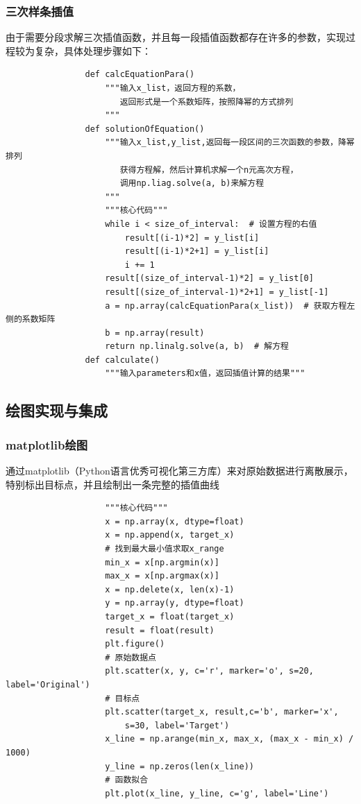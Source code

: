 \documentclass[UTF8]{ctexart}
\begin{document}
            \subsubsection{三次样条插值}
            由于需要分段求解三次插值函数，并且每一段插值函数都存在许多的参数，实现过程较为复杂，具体处理步骤如下：
            \begin{lstlisting}
                def calcEquationPara()
                    """输入x_list，返回方程的系数，
                       返回形式是一个系数矩阵，按照降幂的方式排列
                    """
                def solutionOfEquation()
                    """输入x_list,y_list,返回每一段区间的三次函数的参数，降幂排列
                       获得方程解，然后计算机求解一个n元高次方程，
                       调用np.liag.solve(a, b)来解方程
                    """
                    """核心代码"""
                    while i < size_of_interval:  # 设置方程的右值
                        result[(i-1)*2] = y_list[i]
                        result[(i-1)*2+1] = y_list[i]
                        i += 1
                    result[(size_of_interval-1)*2] = y_list[0]
                    result[(size_of_interval-1)*2+1] = y_list[-1]
                    a = np.array(calcEquationPara(x_list))  # 获取方程左侧的系数矩阵
                    b = np.array(result)
                    return np.linalg.solve(a, b)  # 解方程
                def calculate()
                    """输入parameters和x值，返回插值计算的结果"""
            \end{lstlisting}
        \subsection{绘图实现与集成}
            \subsubsection{matplotlib绘图}
            通过matplotlib（Python语言优秀可视化第三方库）来对原始数据进行离散展示，特别标出目标点，并且绘制出一条完整的插值曲线
                \begin{lstlisting}
                    """核心代码"""
                    x = np.array(x, dtype=float)
                    x = np.append(x, target_x)
                    # 找到最大最小值求取x_range
                    min_x = x[np.argmin(x)]
                    max_x = x[np.argmax(x)]
                    x = np.delete(x, len(x)-1)
                    y = np.array(y, dtype=float)
                    target_x = float(target_x)
                    result = float(result)
                    plt.figure()
                    # 原始数据点
                    plt.scatter(x, y, c='r', marker='o', s=20, label='Original')
                    # 目标点
                    plt.scatter(target_x, result,c='b', marker='x', 
                        s=30, label='Target')
                    x_line = np.arange(min_x, max_x, (max_x - min_x) / 1000)
                    y_line = np.zeros(len(x_line))
                    # 函数拟合
                    plt.plot(x_line, y_line, c='g', label='Line')
                \end{lstlisting}
\end{document}
